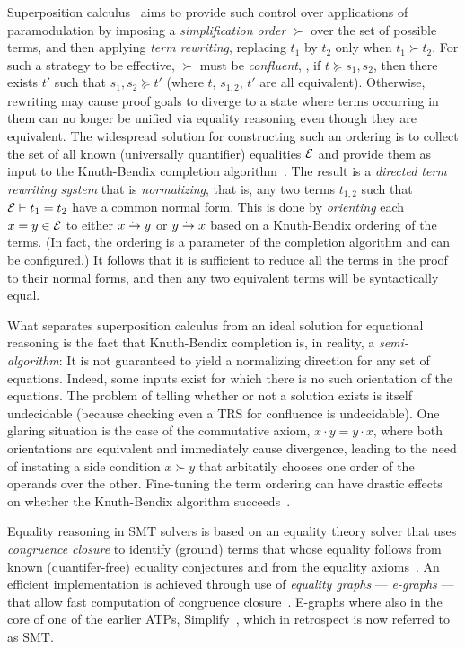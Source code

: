 Superposition calculus~\cite{JACM1965:Robinson,IJCM1965:Robinson} aims to provide such control over applications of paramodulation
by imposing a \emph{simplification order} $\succ$ over the set of possible terms, and then applying \emph{term rewriting}, replacing $t_1$ by $t_2$ only when $t_1\succ t_2$.
For such a strategy to be effective, $\succ$ must be \emph{confluent}, \ie, if $t\succeq s_1,s_2$, then there
exists $t'$ such that $s_1,s_2 \succeq t'$ (where $t$, $s_{1,2}$, $t'$ are all equivalent).
Otherwise, rewriting may cause proof goals to diverge to
a state where terms occurring in them can no longer be unified via equality reasoning even though they are equivalent.
The widespread solution for constructing such an ordering is to collect the set of all known (universally quantifier) equalities $\mathcal{E}$ and provide them as input to the Knuth-Bendix completion algorithm~\cite{AR1983:Knuth}.
The result is a \emph{directed term rewriting system} that is \emph{normalizing}, that is, any two terms $t_{1,2}$ such that $\mathcal{E}\vdash t_1=t_2$
have a common normal form.
This is done by \emph{orienting} each $x=y \in \mathcal{E}$ to either $x\overset{.~}{\to} y$ or $y\overset{.~}{\to} x$ based on a Knuth-Bendix ordering of the terms.
(In fact, the ordering is a parameter of the completion algorithm and can be configured.)
It follows that it is sufficient to reduce all the terms in the proof to their normal forms, and then any two equivalent terms will be syntactically equal.

What separates superposition calculus from an ideal solution for equational reasoning is the fact that Knuth-Bendix completion is, in reality, a \emph{semi-algorithm}:
It is not guaranteed to yield a normalizing direction for any set of equations.
Indeed, some inputs exist for which there is no such orientation of the equations.
The problem of telling whether or not a solution exists is itself undecidable (because checking even a TRS for confluence is undecidable).
One glaring situation is the case of the commutative axiom, $x\cdot y = y\cdot x$, where both orientations are equivalent and immediately cause divergence,
leading to the need of instating a side condition $x\succ y$ that arbitatily chooses one order of the operands over the other.
Fine-tuning the term ordering can have drastic effects on whether the Knuth-Bendix algorithm succeeds~\cite{ICRTA2006:Wehrman}.

Equality reasoning in SMT solvers is based on an equality theory solver that uses \emph{congruence closure} to identify (ground) terms that whose equality follows from known (quantifer-free) equality conjectures and from the equality axioms~\cite{JACM1980:Nelson}.
An efficient implementation is achieved through use of \emph{equality graphs} --- \emph{e-graphs} --- that allow fast computation of congruence closure~\cite{Thesis1980:Nelson}.
E-graphs where also in the core of one of the earlier ATPs, Simplify~\cite{JACM2005:Detlefs},
which in retrospect is now referred to as SMT.

